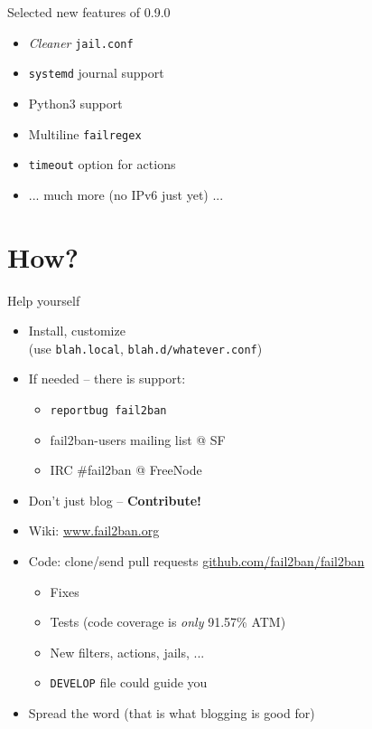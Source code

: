 \documentclass[]{beamer}
\begin{document}
\begin{frame}{Selected new features of 0.9.0}
\begin{itemize}
\item \emph{Cleaner} \texttt{jail.conf}
\item \texttt{systemd} journal support
\item Python3 support
\item Multiline \texttt{failregex}
\item \texttt{timeout} option for actions
\item ... much more (no IPv6 just yet) ...
\end{itemize}
\end{frame}

\section{How?}

\begin{frame}[fragile]{Help yourself }
  \begin{itemize}
    \item Install, customize\\
      (use \texttt{blah.local}, \texttt{blah.d/whatever.conf})
    \item If needed -- there is support:
      \begin{itemize}
      \item \texttt{reportbug fail2ban}
      \item fail2ban-users mailing list @ SF
      \item IRC \#fail2ban @ FreeNode \pause
      \end{itemize}
    \item \alert{Don't just blog -- \textbf{Contribute!}}
    \item Wiki: \href{http://www.fail2ban.org}{www.fail2ban.org}
    \item Code: clone/send pull requests
      \href{http://github.com/fail2ban/fail2ban/pulls}{github.com/fail2ban/fail2ban}
      \begin{itemize}
      \item Fixes
      \item Tests (code coverage is \emph{only} 91.57\% ATM)
      \item New filters, actions, jails, ...
      \item \texttt{DEVELOP} file could guide you
      \end{itemize}
  \item Spread the word (\alert{that is what blogging is good for})
  \end{itemize}
\end{frame}
\end{document}
